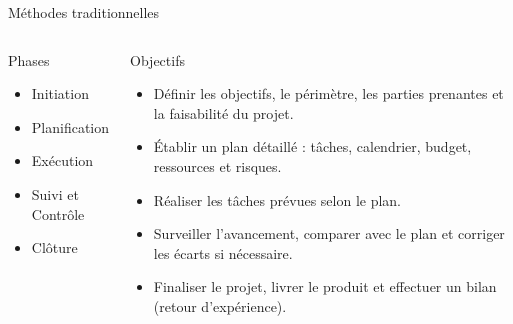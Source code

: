 \documentclass{beamer}
\begin{document}
\begin{frame}{\color{myorange}Méthodes traditionnelles}
  \scriptsize
  \begin{columns}
    {
    \begin{block}{Phases}
      \begin{itemize}
        \item Initiation
        \item Planification
        \item Exécution
        \item Suivi et Contrôle
        \item Clôture
      \end{itemize}
    \end{block}}
    {
    \begin{block}{Objectifs}
      \begin{itemize}
        \item Définir les objectifs, le périmètre, les parties prenantes et la faisabilité du projet.
        \item Établir un plan détaillé : tâches, calendrier, budget, ressources et risques.
        \item Réaliser les tâches prévues selon le plan.
        \item Surveiller l’avancement, comparer avec le plan et corriger les écarts si nécessaire.
        \item Finaliser le projet, livrer le produit et effectuer un bilan (retour d’expérience).
      \end{itemize}
    \end{block}}
  \end{columns}
\end{frame}
\end{document}
